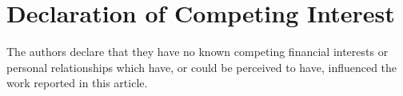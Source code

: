 \documentclass[times,final]{elsarticle}
\begin{document}
\section*{Declaration of Competing Interest}

The authors declare that they have no known competing
financial interests or personal relationships which have, or could be
perceived to have, influenced the work reported in this article. 




%

\end{document}

